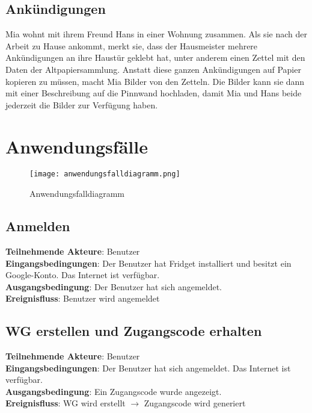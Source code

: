 \documentclass[a4paper]{scrreprt}
\begin{document}
        \subsection{Ankündigungen}
        Mia wohnt mit ihrem Freund Hans in einer Wohnung zusammen. Als sie nach der Arbeit zu Hause ankommt, merkt sie, dass der Hausmeister mehrere Ankündigungen an ihre Haustür geklebt hat, unter anderem einen Zettel mit den Daten der Altpapiersammlung.
        Anstatt diese ganzen Ankündigungen auf Papier kopieren zu müssen, macht Mia Bilder von den Zetteln. Die Bilder kann sie dann mit einer Beschreibung auf die Pinnwand hochladen, damit Mia und Hans beide jederzeit die Bilder zur Verfügung haben.
        

        \newpage
        \section{Anwendungsfälle}
        	\begin{figure}[h!]
        		\centering
        		\texttt{[image: anwendungsfalldiagramm.png]}
        		\caption{Anwendungsfalldiagramm}
        	\end{figure}
        	
        	\newpage
        	
        	\subsection{Anmelden}
        	\textbf{Teilnehmende Akteure}: Benutzer \\
        	\textbf{Eingangsbedingungen}: Der Benutzer hat Fridget installiert und besitzt ein Google-Konto. Das Internet ist verfügbar. \\
        	\textbf{Ausgangsbedingung}: Der Benutzer hat sich angemeldet. \\
        	\textbf{Ereignisfluss}: Benutzer wird angemeldet
        	
        	\subsection{WG erstellen und Zugangscode erhalten}
        	\textbf{Teilnehmende Akteure}: Benutzer \\
        	\textbf{Eingangsbedingungen}: Der Benutzer hat sich angemeldet. Das Internet ist verfügbar. \\
        	\textbf{Ausgangsbedingung}: Ein Zugangscode wurde angezeigt. \\
        	\textbf{Ereignisfluss}: WG wird erstellt $\rightarrow$ Zugangscode wird generiert
        	
\end{document}
